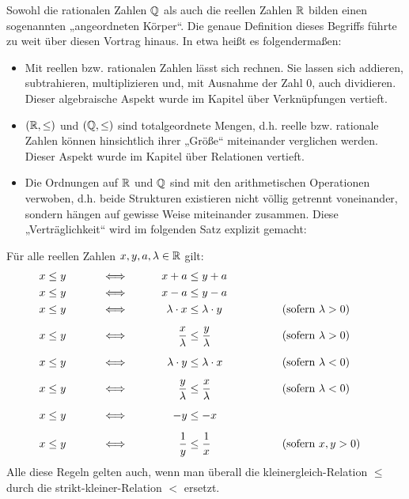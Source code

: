 \begin{bem}
    Sowohl die rationalen Zahlen $\mathbb Q$ als auch die reellen Zahlen $\mathbb R$ bilden einen sogenannten „angeordneten Körper“. Die genaue Definition dieses Begriffs führte zu weit über diesen Vortrag hinaus. In etwa heißt es folgendermaßen:
    \begin{itemize}
        \item Mit reellen bzw. rationalen Zahlen lässt sich rechnen. Sie lassen sich addieren, subtrahieren, multiplizieren und, mit Ausnahme der Zahl $0$, auch dividieren. Dieser algebraische Aspekt wurde im Kapitel über Verknüpfungen vertieft.
        \item $(\mathbb R,\le)$ und $(\mathbb Q,\le)$ sind totalgeordnete Mengen, d.h. reelle bzw. rationale Zahlen können hinsichtlich ihrer „Größe“ miteinander verglichen werden. Dieser Aspekt wurde im Kapitel über Relationen vertieft.
        \item Die Ordnungen auf $\mathbb R$ und $\mathbb Q$ sind mit den arithmetischen Operationen verwoben, d.h. beide Strukturen existieren nicht völlig getrennt voneinander, sondern hängen auf gewisse Weise miteinander zusammen. Diese „Verträglichkeit“ wird im folgenden Satz explizit gemacht:
    \end{itemize}
\end{bem}


\begin{satz} \label{ungleichungregeln}
    Für alle reellen Zahlen $x,y,a,\lambda\in \mathbb R$ gilt:
    \begingroup
    \allowdisplaybreaks
    \begin{alignat*}{4}
        x&\le y &\qquad&\iff&\qquad x+a&\le y+a \\
        x&\le y &\qquad&\iff&\qquad x-a&\le y-a \\
        x&\le y &\qquad&\iff&\qquad \lambda \cdot x&\le \lambda \cdot y &\qquad&\qquad (\textnormal{sofern $\lambda>0$}) \\[0.5em]
        x&\le y &\qquad&\iff&\qquad \frac{x}{\lambda} &\le \frac{y}{\lambda} &\qquad&\qquad (\textnormal{sofern $\lambda>0$}) \\[0.5em]
        x&\le y &\qquad&\iff&\qquad \lambda \cdot y&\le \lambda \cdot x &\qquad&\qquad (\textnormal{sofern $\lambda<0$}) \\[0.5em]
        x&\le y &\qquad&\iff&\qquad \frac{y}{\lambda} &\le \frac{x}{\lambda} &\qquad&\qquad (\textnormal{sofern $\lambda<0$}) \\[0.5em]
        x&\le y &\qquad &\iff&\qquad -y&\le -x \\[0.5em]
        x&\le y &\qquad&\iff&\qquad \frac{1}{y} & \le\frac{1}{x} &\qquad&\qquad (\textnormal{sofern $x,y>0$})
    \end{alignat*}
    \endgroup
    Alle diese Regeln gelten auch, wenn man überall die kleinergleich-Relation $\le$ durch die strikt-kleiner-Relation $<$ ersetzt.
\end{satz}


